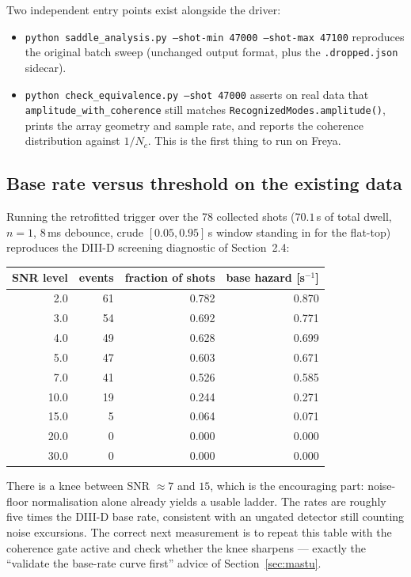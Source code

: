 \documentclass[11pt,a4paper]{article}
\newcommand{\code}[1]{\texttt{\small #1}}
\newcommand{\bk}{\discretionary{}{}{}}   %
\begin{document}
\medskip
\noindent Two independent entry points exist alongside the driver:

\begin{itemize}[leftmargin=2em]
\item \code{python saddle\_analysis.py \bk --shot-min 47000 \bk --shot-max 47100} reproduces the
original batch sweep (unchanged output format, plus the \code{.dropped.json} sidecar).
\item \code{python check\_\bk equivalence.py --shot 47000} asserts on real data that
\code{amplitude\_\bk with\_\bk coherence} still matches \code{Recognized\bk Modes.\bk amplitude()}, prints
the array geometry and sample rate, and reports the coherence distribution against $1/N_c$.
This is the first thing to run on Freya.
\end{itemize}

\subsection{Base rate versus threshold on the existing data}

Running the retrofitted trigger over the 78 collected shots ($70.1$\,s of total dwell,
$n=1$, $8$\,ms debounce, crude $[0.05, 0.95]$\,s window standing in for the flat-top)
reproduces the DIII-D screening diagnostic of Section~2.4:

\begin{center}
\begin{tabular}{@{}rrrr@{}}
\toprule
SNR level & events & fraction of shots & base hazard [s$^{-1}$] \\
\midrule
 2.0 & 61 & 0.782 & 0.870 \\
 3.0 & 54 & 0.692 & 0.771 \\
 4.0 & 49 & 0.628 & 0.699 \\
 5.0 & 47 & 0.603 & 0.671 \\
 7.0 & 41 & 0.526 & 0.585 \\
10.0 & 19 & 0.244 & 0.271 \\
15.0 &  5 & 0.064 & 0.071 \\
20.0 &  0 & 0.000 & 0.000 \\
30.0 &  0 & 0.000 & 0.000 \\
\bottomrule
\end{tabular}
\end{center}

There is a knee between SNR $\approx 7$ and $15$, which is the encouraging part: noise-floor
normalisation alone already yields a usable ladder. The rates are roughly five times the
DIII-D base rate, consistent with an ungated detector still counting noise excursions. The
correct next measurement is to repeat this table with the coherence gate active and check
whether the knee sharpens --- exactly the ``validate the base-rate curve first'' advice of
Section~\ref{sec:mastu}.
\end{document}
